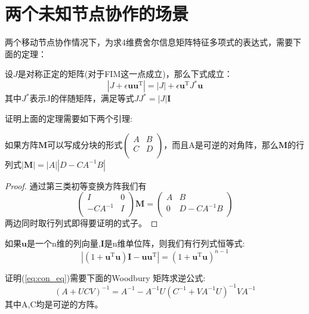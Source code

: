 \section{两个未知节点协作的场景}\label{section:two_node_cooperation}
两个移动节点协作情况下，为求4维费舍尔信息矩阵特征多项式的表达式，需要下面的定理：
\begin{theorem}\label{thm:ShenIden}
设$J$是对称正定的矩阵(对于FIM这一点成立)，那么下式成立：
\begin{equation}\label{eq:ShenIden}
|J+\epsilon \bm{u}\bm{u}^{\textrm{T}} |=|J|+\epsilon \bm{u}^{\textrm{T}} J^*\bm{u}
\end{equation}
其中$J^*$表示J的伴随矩阵，满足等式$JJ^*=|J|\bm{I}$
\end{theorem}
证明上面的定理需要如下两个引理:
\begin{lemma}\label{lemma:block}
如果方阵$\bm{M}$可以写成分块的形式$\left(\begin{array}{cc}
A&B\\
C&D\\
\end{array}\right)$，而且A是可逆的对角阵，那么$\bm{M}$的行列式$|\bm{M}|=|A||D-CA^{-1}B|$
\end{lemma}


\begin{proof}
通过第三类初等变换方阵我们有\[
\left(\begin{array}{cc}
I&0\\
-CA^{-1}&I\\
\end{array}\right) \bm{M}=\left(\begin{array}{cc}
A&B\\
0&D-CA^{-1}B\\
\end{array}\right)\]
两边同时取行列式即得要证明的式子。
\end{proof}
\begin{lemma}
如果$\bm{u}$是一个n维的列向量,$\bm{I}$是n维单位阵，则我们有行列式恒等式:
\begin{equation}\label{eq:con_eq}
|(1+\bm{u}^{\textrm{T}} \bm{u})\bm{I}-\bm{u}\bm{u}^{\textrm{T}} |=(1+\bm{u}^{\textrm{T}} \bm{u})^{n-1}
\end{equation}
\end{lemma}
证明(\ref{eq:con_eq})需要下面的Woodbury 矩阵求逆公式:
\begin{equation}\label{eq:woodbury}
(A+UCV)^{-1}=A^{-1}-A^{-1}U(C^{-1}+VA^{-1}U)^{-1}VA^{-1}
\end{equation}
其中A,C均是可逆的方阵。


